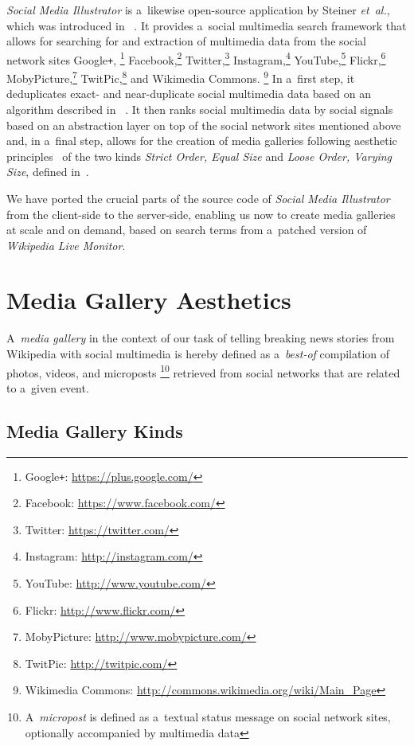 \documentclass{sig-alternate}
\newcommand{\inlinelistingsize}{\fontsize{8pt}{11pt}}
\let\oldurl\url
\renewcommand{\url}[1]{\inlinelistingsize\oldurl{#1}}
\begin{document}
\emph{Social Media Illustrator} is a~likewise
open-source application by Steiner \emph{et~al.},
which was introduced in%
~\cite{steiner2013meteoroid,steiner2013tocrop}.
It provides a~social multimedia search framework
that allows for searching for and extraction of
multimedia data from the social network sites
Google\texttt{+},%
\footnote{Google\texttt{+}: \url{https://plus.google.com/}}
Facebook,\footnote{Facebook: \url{https://www.facebook.com/}}
Twitter,\footnote{Twitter: \url{https://twitter.com/}}
Instagram,\footnote{Instagram: \url{http://instagram.com/}}
YouTube,\footnote{YouTube: \url{http://www.youtube.com/}}
Flickr,\footnote{Flickr: \url{http://www.flickr.com/}}
MobyPicture,\footnote{MobyPicture: \url{http://www.mobypicture.com/}}
TwitPic,\footnote{TwitPic: \url{http://twitpic.com/}}
and Wikimedia Commons.%
\footnote{Wikimedia Commons: \url{http://commons.wikimedia.org/wiki/Main_Page}}
In a~first step, it deduplicates exact- and near-duplicate
social multimedia data based on an algorithm described in%
~\cite{steiner2013clustering}.
It then ranks social multimedia data by social signals%
~\cite{steiner2013meteoroid} based on an abstraction layer
on top of the social network sites mentioned above
and, in a~final step, allows for the creation of media galleries
following aesthetic principles~\cite{steiner2012aesthetic}
of the two kinds \emph{Strict Order, Equal Size}
and \emph{Loose Order, Varying Size},
defined in~\cite{steiner2013tocrop}.

We have ported the crucial parts
of the source code of \emph{Social Media Illustrator}
from the client-side to the server-side,
enabling us now to create media galleries at scale and on demand,
based on search terms from a~patched version of \emph{Wikipedia Live Monitor}.

\section{Media Gallery Aesthetics}
\label{sec:media-gallery-aesthetics}
\selectfont

A~\emph{media gallery} in the context of our task of
telling breaking news stories from Wikipedia with social multimedia
is hereby defined as a~\emph{best-of} compilation of photos, videos,
and microposts%
\footnote{A~\emph{micropost} is defined as a~textual status message
on social network sites, optionally accompanied by multimedia data}
retrieved from social networks that are related to a~given event.

\subsection{Media Gallery Kinds}
\end{document}
